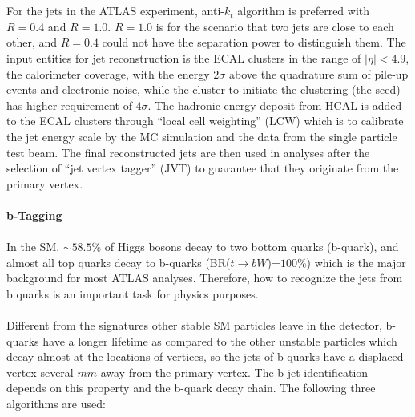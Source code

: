 \\
\\For the jets in the ATLAS experiment, anti-$k_{t}$ algorithm is preferred with $R=0.4$ and $R=1.0$. $R=1.0$ is for the scenario that two jets are close to each other, and $R=0.4$ could not have the separation power to distinguish them. The input entities for jet reconstruction is the ECAL clusters in the range of $|\eta|<4.9$, the calorimeter coverage, with the energy $2\sigma$ above the quadrature sum of pile-up events and electronic noise, while the cluster to initiate the clustering (the seed) has higher requirement of $4\sigma$. The hadronic energy deposit from HCAL is added to the ECAL clusters through ``local cell weighting'' (LCW)\cite{Barillari:1112035} which is to calibrate the jet energy scale by the MC simulation and the data from the single particle test beam. The final reconstructed jets are then used in analyses after the selection of ``jet vertex tagger'' (JVT)\cite{ATLAS-CONF-2014-018} to guarantee that they originate from the primary vertex. 
\\
\\{\bf b-Tagging\cite{ATL-PHYS-PUB-2015-022}}
\\
\\In the SM, $\sim 58.5\%$ of Higgs bosons decay to two bottom quarks (b-quark), and almost all top quarks decay to b-quarks (BR($t \rightarrow bW$)=$100\%$) which is the major background for most ATLAS analyses. Therefore, how to recognize the jets from b quarks is an important task for physics purposes.
\\
\\Different from the signatures other stable SM particles leave in the detector, b-quarks have a longer lifetime as compared to the other unstable particles which decay almost at the locations of vertices, so the jets of b-quarks have a displaced vertex several $mm$ away from the primary vertex. The b-jet identification depends on this property and the b-quark decay chain. The following three algorithms are used:

